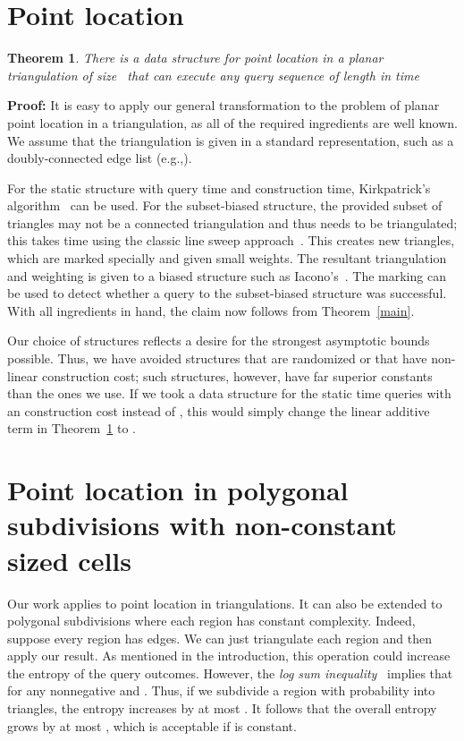 \documentclass[11pt]{article}
\newtheorem{theorem}[figure]{Theorem}
\newenvironment{proof}{\noindent\textbf{Proof: }\ignorespaces}
  {\hspace*{\fill}\medskip}
\begin{document}
\section{Point location}


\begin{theorem}\label{ppl} 
There is a data structure for point location
in a planar triangulation of size~ that can execute any query sequence of
length  in time 
 
\end{theorem}

\begin{proof} 
It is easy to apply our general transformation to the problem of planar
point location in a triangulation, as all of the required ingredients
are well known.  We assume that the triangulation is given in a standard
representation, such as a doubly-connected edge list 
(e.g.,\cite[\S 2.2]{marks}). 

For the static structure with  query time and   
construction time, Kirkpatrick's algorithm~\cite{kirk} can
be used.  For the subset-biased structure, the provided subset of 
 triangles may not be a connected triangulation and thus needs to
be triangulated; this takes time  using the classic 
line sweep approach~\cite{LeePr77}. 
This creates  new triangles, which are marked specially and given
small weights. 
The resultant triangulation and weighting is given to a biased structure 
such as Iacono's~\cite{Iacono04}. The marking can be used to detect whether
a query to the subset-biased structure was successful. 
With all ingredients in hand, the claim now follows from Theorem~\ref{main}.
\end{proof}

Our choice of structures reflects a desire for the strongest asymptotic
bounds possible. Thus, we have avoided structures that are randomized or
that have non-linear construction cost; such structures, however, have far
superior constants than the ones we use. If we took a data structure for the
static  time queries with an 
construction cost instead of , this would simply change the linear 
additive term in Theorem~\ref{ppl} to .

\section{Point location in polygonal subdivisions with non-constant sized
cells}
Our work applies to point location in triangulations.
It can also be extended to polygonal subdivisions
where each region has constant complexity. Indeed, suppose
every region has  edges. We can just triangulate each region and
then apply our result. As mentioned in the introduction,
this operation could increase the entropy of the query outcomes.
However, the \emph{log sum inequality}~\cite[Theorem~2.7.1]{CoverTh06}
implies that 
for any nonnegative  and .
Thus, if we subdivide a region with probability  into
 triangles, the entropy increases by at most . It
follows that the overall entropy grows by at most , which 
is acceptable if  is constant.
\end{document}
